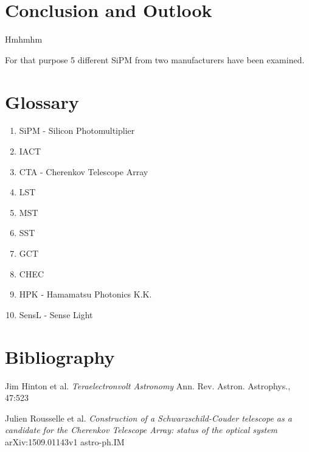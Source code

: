 \documentclass[12pt,article,type=msc,colorback,accentcolor=tud9c]{tudthesis}
\begin{document}
{%


\section{\Large Conclusion and Outlook}

Hmhmhm

For that purpose 5 different SiPM from two manufacturers have been examined.

\newpage
\section{\Large Glossary}
\begin{enumerate}
\item SiPM - Silicon Photomultiplier
\item IACT
\item CTA - Cherenkov Telescope Array
\item LST
\item MST
\item SST
\item GCT
\item CHEC



\item HPK - Hamamatsu Photonics K.K.
\item SensL - Sense Light
\end{enumerate}


\newpage
\section{\Large Bibliography}
\begin{thebibliography}{12}

 Jim Hinton et al. \textit{Teraelectronvolt Astronomy} Ann. Rev. Astron. Astrophys., 47:523

 Julien Rousselle et al. \textit{Construction of a Schwarzschild-Couder telescope as a candidate for the Cherenkov Telescope Array: status of the optical system}  arXiv:1509.01143v1 astro-ph.IM


\end{thebibliography}}
\end{document}
